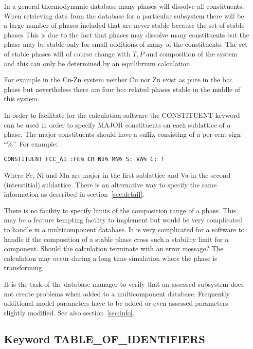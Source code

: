 \documentclass[12pt]{article}
\begin{document}
In a general thermodynamic database many phases will dissolve all
constituents.  When retrieving data from the database for a particular
subsystem there will be a large number of phases included that are
never stable because the set of stable phases This is due to the fact
that phases may dissolve many constituents but the phase may be stable
only for small additions of many of the constituents.  The set of
stable phases will of course change with $T, P$ and composition of the
system and this can only be determined by an equilibrium calculation.

For example in the Cu-Zn system neither Cu nor Zn exist as pure in the
bcc phase but nevertheless there are four bcc related phases stable in
the middle of this system.

In order to facilitate for the calculation software the CONSTITUENT
keyword can be used in order to specify MAJOR constituents on each
sublattice of a phase.  The major constituents should have a suffix
consisting of a per-cent sign ``\%''.  For example:

\begin{verbatim}
CONSTITUENT FCC_A1 :FE% CR NI% MN% S: VA% C: !
\end{verbatim}

Where Fe, Ni and Mn are major in the first sublattice and Va in the
second (interstitial) sublattice.  There is an alternative way to
specify the same information as described in section~\ref{sec:detail}.

There is no facility to specify limits of the composition range of a
phase.  This may be a feature tempting facility to implement but would
be very complicated to handle in a multicomponent database.  It is
very complicated for a software to handle if the composition of a
stable phase cross such a stability limit for a component.  Should the
calculation terminate with an error message?  The calculation may 
occur during a long time simulation where the phase is transforming.

It is the task of the database manager to verify that an assessed
subsystem does not create problems when added to a multicomponent
database.  Frequently additional model parameters have to be added or
even assessed parameters slightly modified.  See also
section~\ref{sec:info}.

\subsection{Keyword TABLE\_OF\_IDENTIFIERS}\label{sec:paramid}
\end{document}
